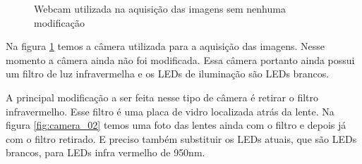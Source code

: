 \begin{figure}[ht!]
	\centering
	\setlength{\fboxsep}{1pt}
  	\caption{Webcam utilizada na aquisição das imagens sem nenhuma modificação}
  	\label{fig:camera_01}
\end{figure}


Na figura \ref{fig:camera_01} temos a câmera utilizada para a aquisição das imagens. Nesse momento a câmera ainda não foi modificada. Essa câmera portanto ainda possui um filtro de luz infravermelha e os LEDs de iluminação são LEDs brancos.

A principal modificação a ser feita nesse tipo de câmera é retirar o filtro infravermelho. Esse filtro é uma placa de vidro localizada atrás da lente. Na figura \ref{fig:camera_02} temos uma foto das lentes ainda com o filtro e depois já com o filtro retirado. E preciso também substituir os LEDs atuais, que são LEDs brancos, para LEDs infra vermelho de 950nm.

